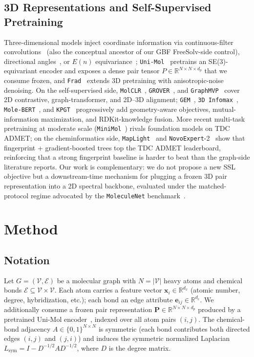 \documentclass[conference]{IEEEtran}
\begin{document}
\subsection{3D Representations and Self-Supervised Pretraining}
Three-dimensional models inject coordinate information via continuous-filter convolutions~\cite{schutt2017schnet} (also the conceptual ancestor of our GBF FreeSolv-side control), directional angles~\cite{klicpera2020dimenet}, or $E(n)$ equivariance~\cite{satorras2021egnn}; \texttt{Uni-Mol}~\cite{zhou2023unimol} pretrains an SE(3)-equivariant encoder and exposes a dense pair tensor $P \in \mathbb{R}^{N\times N\times d_p}$ that we consume frozen, and \texttt{Frad}~\cite{feng2024frad} extends 3D pretraining with anisotropic-noise denoising. On the self-supervised side, \texttt{MolCLR}~\cite{wang2022molclr}, \texttt{GROVER}~\cite{rong2020grover}, and \texttt{GraphMVP}~\cite{liu2022graphmvp} cover 2D contrastive, graph-transformer, and 2D--3D alignment; \texttt{GEM}~\cite{fang2022gem}, \texttt{3D Infomax}~\cite{stark2022infomax}, \texttt{Mole-BERT}~\cite{xia2023molebert}, and \texttt{KPGT}~\cite{li2023kpgt} progressively add geometry-aware objectives, mutual-information maximization, and RDKit-knowledge fusion. More recent multi-task pretraining at moderate scale (\texttt{MiniMol}~\cite{klaeser2024minimol}) rivals foundation models on TDC ADMET; on the cheminformatics side, \texttt{MapLight}~\cite{notwell2023maplight} and \texttt{NovoExpert}-2~\cite{novoexpert2026} show that fingerprint + gradient-boosted trees top the TDC ADMET leaderboard, reinforcing that a strong fingerprint baseline is harder to beat than the graph-side literature reports. Our work is complementary: we do not propose a new SSL objective but a downstream-time mechanism for plugging a frozen 3D pair representation into a 2D spectral backbone, evaluated under the matched-protocol regime advocated by the \texttt{MoleculeNet} benchmark~\cite{wu2018moleculenet}.

\section{Method}
\label{sec:method}

\subsection{Notation}
Let $G=(\mathcal{V},\mathcal{E})$ be a molecular graph with $N=|\mathcal{V}|$ heavy atoms and chemical bonds $\mathcal{E}\subseteq\mathcal{V}\times\mathcal{V}$. Each atom carries a feature vector $\mathbf{x}_i\in\mathbb{R}^{d_x}$ (atomic number, degree, hybridization, etc.); each bond an edge attribute $\mathbf{e}_{ij}\in\mathbb{R}^{d_e}$. We additionally consume a frozen pair representation $\mathbf{P}\in\mathbb{R}^{N\times N\times d_p}$ produced by a pretrained Uni-Mol encoder~\cite{zhou2023unimol}, indexed over all atom pairs $(i,j)$. The chemical-bond adjacency $A\in\{0,1\}^{N\times N}$ is symmetric (each bond contributes both directed edges $(i,j)$ and $(j,i)$) and induces the symmetric normalized Laplacian $L_{\mathrm{sym}}=I-D^{-1/2}AD^{-1/2}$, where $D$ is the degree matrix.
\end{document}
